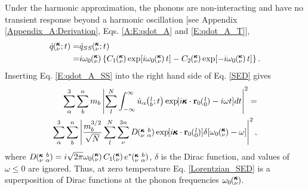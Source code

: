 Under the harmonic approximation, the phonons 
are non-interacting and have no transient response beyond a harmonic 
oscillation [see Appendix \ref{Appendix_A:Derivation},  
Eqs$.$ \eqref{A:E:qdot_A} and \eqref{E:qdot_A_T}],
\begin{equation}\label{E:qdot_A_SS}
\begin{split}
\dot{q}\kvt =& \dot{q}_{SS}\kvt  \\
=& i\omega_0\kv\left\{C_1\kv\exp[i\omega_0\kv t]-C_2\kv
\exp[-i\omega_0\kv t]\right\}.
 \end{split}
\end{equation}
Inserting Eq$.$ \eqref{E:qdot_A_SS} into the right hand side of Eq$.$ 
\eqref{SED} gives
\begin{equation}\label{Delta_SED}
\begin{split}
\sum_\alpha^3 \sum_b^n m_b \left| \sum_l^N  \int_{-\infty}^{\infty} 
\dot{u}_{\alpha}\lbt \EXP{i\pmb{\kappa}\cdot
\mathbf{r}_0\ab{l}{0}-i\omega t} 
dt \right|^2 =& \\
\sum_\alpha^3 \sum_b^n\left| \frac{m_b^{3/2}}{\sqrt{N}} \sum_l^N 
\sum_{\nu}^{3n}  D\kvba \EXP{i\pmb{\kappa}\cdot\mathbf{r}_0\ab{l}{0}} 
\delta[ \omega_0\kv - \omega] \right|^2 ,
 \end{split}
\end{equation}
where $D\kvba = i\sqrt{2\pi} \omega_0\kv C_1\kv e^*\kvba$, $\delta$ is 
the Dirac function, and values of $\omega \le 0$ are ignored. Thus, at 
zero temperature Eq$.$ \eqref{Lorentzian_SED} is a superposition of Dirac 
functions at the phonon frequencies $\omega_0\mspace{-4.0mu}\left(\mspace{-8.0mu} \begin{smallmatrix}&\pmb{\kappa} \\&\nu\end{smallmatrix} \mspace{-3.0mu}\right)$.

